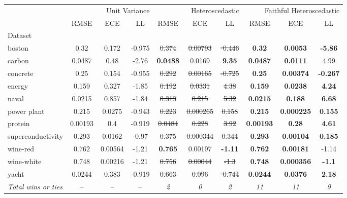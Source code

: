 \begin{tabular}{l|ccc|ccc|ccc}
\toprule
{} & \multicolumn{3}{r}{Unit Variance} & \multicolumn{3}{r}{Heteroscedastic} & \multicolumn{3}{r}{Faithful Heteroscedastic} \\
{} & {RMSE} & {ECE} & {LL} & {RMSE} & {ECE} & {LL} & {RMSE} & {ECE} & {LL} \\
{Dataset} & {} & {} & {} & {} & {} & {} & {} & {} & {} \\
\midrule
boston & 0.32 & 0.172 & -0.975 & \sout{0.374} & \sout{0.00793} & \sout{-0.446} & \textbf{0.32} & \textbf{0.0053} & \textbf{-5.86} \\
carbon & 0.0487 & 0.48 & -2.76 & \textbf{0.0488} & 0.0169 & \textbf{9.35} & \textbf{0.0487} & \textbf{0.0111} & 4.99 \\
concrete & 0.25 & 0.154 & -0.955 & \sout{0.292} & \sout{0.00165} & \sout{-0.725} & \textbf{0.25} & \textbf{0.00374} & \textbf{-0.267} \\
energy & 0.159 & 0.327 & -1.85 & \sout{0.192} & \sout{0.0331} & \sout{4.38} & \textbf{0.159} & \textbf{0.0238} & \textbf{4.24} \\
naval & 0.0215 & 0.857 & -1.84 & \sout{0.313} & \sout{0.215} & \sout{5.32} & \textbf{0.0215} & \textbf{0.188} & \textbf{6.68} \\
power plant & 0.215 & 0.0275 & -0.943 & \sout{0.223} & \sout{0.000265} & \sout{0.158} & \textbf{0.215} & \textbf{0.000225} & \textbf{0.155} \\
protein & 0.00193 & 0.4 & -0.919 & \sout{0.0484} & \sout{0.228} & \sout{3.92} & \textbf{0.00193} & \textbf{0.28} & \textbf{4.61} \\
superconductivity & 0.293 & 0.0162 & -0.97 & \sout{0.375} & \sout{0.000344} & \sout{0.344} & \textbf{0.293} & \textbf{0.00104} & \textbf{0.185} \\
wine-red & 0.762 & 0.00564 & -1.21 & \textbf{0.765} & 0.00197 & \textbf{-1.11} & \textbf{0.762} & \textbf{0.00181} & -1.14 \\
wine-white & 0.748 & 0.00216 & -1.21 & \sout{0.756} & \sout{0.00044} & \sout{-1.3} & \textbf{0.748} & \textbf{0.000356} & \textbf{-1.1} \\
yacht & 0.0244 & 0.383 & -0.919 & \sout{0.663} & \sout{0.096} & \sout{-0.744} & \textbf{0.0244} & \textbf{0.0376} & \textbf{2.18} \\
\textit{{Total wins or ties}} & -- & -- & -- & \textit{2} & \textit{0} & \textit{2} & \textit{11} & \textit{11} & \textit{9} \\
\bottomrule
\end{tabular}
